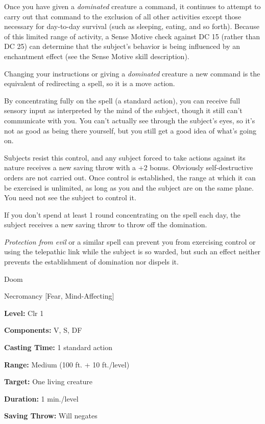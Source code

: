 \documentclass{article}
\begin{document}
Once you have given a \textit{dominated }creature a command, it continues to attempt 
to carry out that command to the exclusion of all other activities except those 
necessary for day-to-day survival (such as sleeping, eating, and so forth). Because 
of this limited range of activity, a Sense Motive check against DC 15 (rather than 
DC 25) can determine that the subject's behavior is being influenced by an enchantment 
effect (see the Sense Motive skill description).

Changing your instructions or giving a \textit{dominated }creature a new command 
is the equivalent of redirecting a spell, so it is a move action.

By concentrating fully on the spell (a standard action), you can receive full sensory 
input as interpreted by the mind of the subject, though it still can't communicate 
with you. You can't actually see through the subject's eyes, so it's not as good 
as being there yourself, but you still get a good idea of what's going on.

Subjects resist this control, and any subject forced to take actions against its 
nature receives a new saving throw with a +2 bonus. Obviously self-destructive 
orders are not carried out. Once control is established, the range at which it 
can be exercised is unlimited, as long as you and the subject are on the same plane. 
You need not see the subject to control it.

If you don't spend at least 1 round concentrating on the spell each day, the subject 
receives a new saving throw to throw off the domination.

\textit{Protection from evil }or a similar spell can prevent you from exercising 
control or using the telepathic link while the subject is so warded, but such an 
effect neither prevents the establishment of domination nor dispels it.

\vspace{12pt}
Doom

Necromancy [Fear, Mind-Affecting]

\textbf{Level:} Clr 1

\textbf{Components:} V, S, DF

\textbf{Casting Time:} 1 standard action

\textbf{Range: }Medium (100 ft. + 10 ft./level)

\textbf{Target:} One living creature

\textbf{Duration:} 1 min./level

\textbf{Saving Throw: }Will negates
\end{document}
